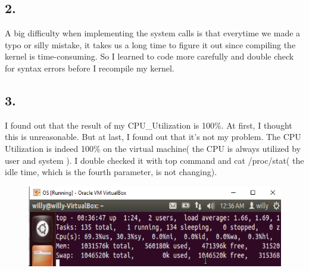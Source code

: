 \documentclass{article}
\begin{document}
        \subsection*{2.} A big difficulty when implementing the system calls is that everytime we made a typo or silly mistake, it takes us a long time to figure it out since compiling the kernel is time-consuming. So I learned to code more carefully and double check for syntax errors before I recompile my kernel.
        \subsection*{3.} I found out that the result of my CPU\_Utilization is 100\%. At first, I thought this is unreasonable. But at last, I found out that it's not my problem. The CPU Utilization is indeed 100\% on the virtual machine( the CPU is always utilized by user and system ). I double checked it with top command and cat /proc/stat( the idle time, which is the fourth parameter,  is not changing).
        \begin{figure}[!htb]
            \includegraphics[scale=0.4]{top.png}
        \end{figure}
\end{document}

